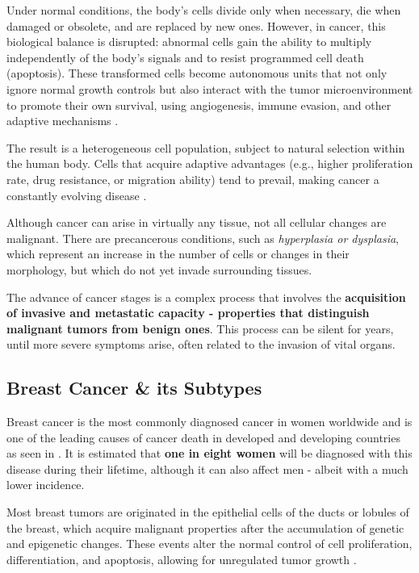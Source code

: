 Under normal conditions, the body's cells divide only when necessary, die when
damaged or obsolete, and are replaced by new ones. However, in cancer, this
biological balance is disrupted: abnormal cells gain the ability to multiply
independently of the body's signals and to resist programmed cell death
(apoptosis). These transformed cells become autonomous units that not only
ignore normal growth controls but also interact with the tumor microenvironment
to promote their own survival, using angiogenesis, immune evasion, and other
adaptive mechanisms \cite{def_of_cancer_Brown2023,NCI2021}.

The result is a heterogeneous cell population, subject to natural selection
within the human body. Cells that acquire adaptive advantages (e.g., higher
proliferation rate, drug resistance, or migration ability) tend to prevail,
making cancer a constantly evolving disease \cite{def_of_cancer_Brown2023}.

Although cancer can arise in virtually any tissue, not all cellular changes are
malignant. There are precancerous conditions, such as \textit{hyperplasia or
  dysplasia}, which represent an increase in the number of cells or changes in
their morphology, but which do not yet invade surrounding tissues.

The advance of cancer stages is a complex process that involves the
\textbf{acquisition of invasive and metastatic capacity - properties that
  distinguish malignant tumors from benign ones}. This process can be silent for
years, until more severe symptoms arise, often related to the invasion of vital
organs.

\subsection{Breast Cancer \& its Subtypes}

Breast cancer is the most commonly diagnosed cancer in women worldwide and is
one of the leading causes of cancer death in developed and developing countries
as seen in \textcite{BreastEpidemiology_Romanowicz2022,
  updatedbca_Hong2022Breast}. It is estimated that \textbf{one in eight women}
will be diagnosed with this disease during their lifetime, although it can also
affect men - albeit with a much lower incidence.

Most breast tumors are originated in the epithelial cells of the ducts or
lobules of the breast, which acquire malignant properties after the
accumulation of genetic and epigenetic changes. These events alter the normal
control of cell proliferation, differentiation, and apoptosis, allowing for
unregulated tumor growth \cite{origins_and_evolution_bca_Polyak2007}.


